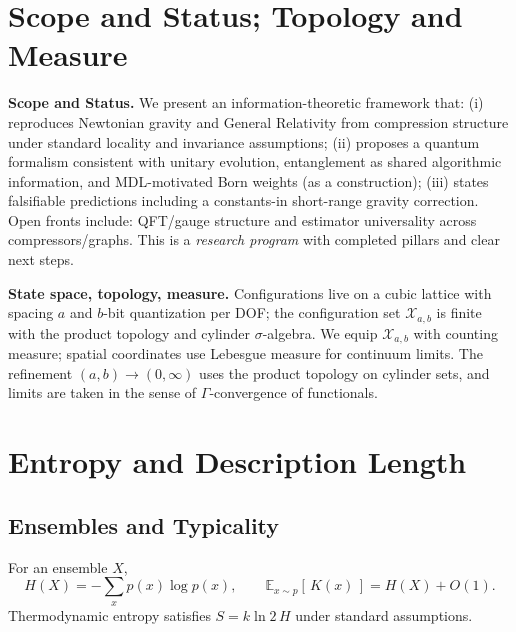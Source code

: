 \documentclass[aps,preprint,onecolumn,longbibliography,nofootinbib]{revtex4-2}
\numberwithin{equation}{section}        %
\begin{document}
\section{Scope and Status; Topology and Measure}
\textbf{Scope and Status.} We present an information-theoretic framework that:
(i) reproduces Newtonian gravity and General Relativity from compression structure under standard locality and invariance assumptions; (ii) proposes a quantum formalism consistent with unitary evolution, entanglement as shared algorithmic information, and MDL-motivated Born weights (as a construction); (iii) states falsifiable predictions including a constants-in short-range gravity correction.
Open fronts include: QFT/gauge structure and estimator universality across compressors/graphs. This is a \emph{research program} with completed pillars and clear next steps.

\textbf{State space, topology, measure.} Configurations live on a cubic lattice with spacing $a$ and $b$-bit quantization per DOF; the configuration set $\mathcal X_{a,b}$ is finite with the product topology and cylinder $\sigma$-algebra. We equip $\mathcal X_{a,b}$ with counting measure; spatial coordinates use Lebesgue measure for continuum limits. The refinement $(a,b)\to (0,\infty)$ uses the product topology on cylinder sets, and limits are taken in the sense of $\Gamma$-convergence of functionals.

\section{Entropy and Description Length}

\subsection{Ensembles and Typicality}
For an ensemble $X$,
\begin{equation}
H(X) = -\sum_x p(x)\log p(x), \qquad
\mathbb{E}_{x\sim p}[\,K(x)\,] = H(X) + O(1). \label{eq:shannonK}
\end{equation}
Thermodynamic entropy satisfies $S = k\ln 2 \, H$ under standard assumptions.
\end{document}

